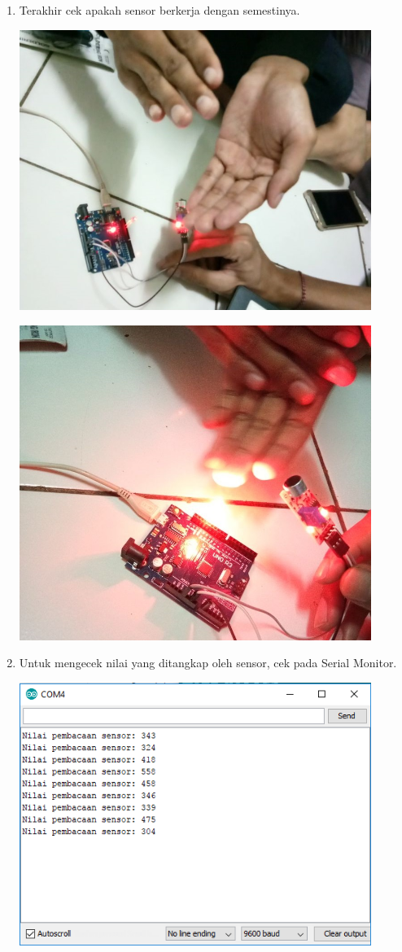 \begin{enumerate}
\item Terakhir cek apakah sensor berkerja dengan semestinya.
\break
\centerline{\includegraphics[width=0.9\textwidth]{figures/ss12.jpeg}}
\break
\centerline{\includegraphics[width=0.9\textwidth]{figures/ss13.jpeg}}
\item Untuk mengecek nilai yang ditangkap oleh sensor, cek pada Serial Monitor.
\break
\centerline{\includegraphics[width=0.9\textwidth]{figures/ss14.png}}

\end{enumerate}

%